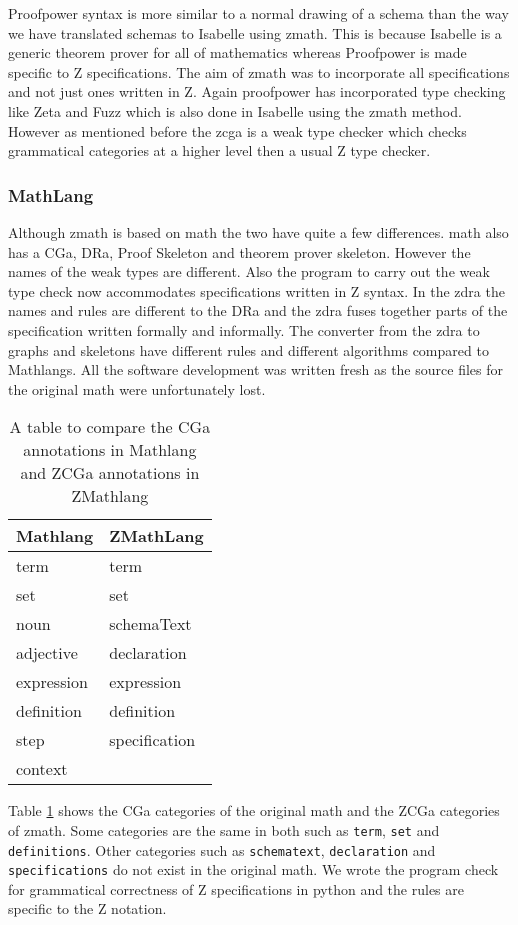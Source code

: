 Proofpower syntax is more similar to a normal drawing of a schema
than the way we have translated schemas to Isabelle using \gls{zmath}. This is
because Isabelle is a generic theorem prover for all of mathematics whereas
Proofpower is made specific to Z specifications. The aim of \gls{zmath} was to
incorporate all specifications and not just ones written in Z. Again proofpower
has incorporated type checking like Zeta and Fuzz which is also done in Isabelle
using the \gls{zmath} method. However as mentioned before the \gls{zcga} is a
weak type checker which checks grammatical categories at a higher level then a
usual Z type checker.

\subsubsection{MathLang}
Although \gls{zmath} is based on \gls{math} the two have quite a few
differences. \Gls{math} also has a CGa, DRa, Proof Skeleton and theorem prover
skeleton. However the names of the weak types are different. Also the program to
carry out the weak type check now accommodates specifications written in Z
syntax. In the \gls{zdra} the names and rules are different to the DRa and the
\gls{zdra} fuses together parts of the specification written formally and
informally. The converter from the
\gls{zdra} to graphs and skeletons have different rules and different algorithms
compared to Mathlangs. All the software development was written fresh as the source files
for the original \gls{math} were unfortunately lost.

\begin{table}[H]
    \centering
\begin{tabular}{|l | l|}
\hline
Mathlang & ZMathLang \\
\hline
term & term \\
set & set \\
noun & schemaText \\
adjective & declaration \\
expression & expression \\
definition & definition \\
step & specification \\
context & \\
\hline
\end{tabular}
\caption{A table to compare the CGa annotations in Mathlang and ZCGa annotations in ZMathlang \label{tab:comparecga}}
\end{table}

Table \ref{tab:comparecga} shows the CGa categories of the original \gls{math}
and the ZCGa categories of \gls{zmath}. Some categories are the same in both
such as \texttt{term}, \texttt{set} and \texttt{definitions}. Other categories
such as \texttt{schematext}, \texttt{declaration} and \texttt{specifications} do
not exist in the original \gls{math}. We wrote the program check for grammatical
correctness of Z specifications in python and the rules are specific to the Z notation.

